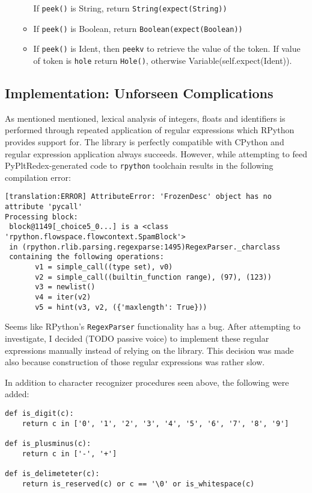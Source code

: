 \begin{itemize}
\begin{itemize}
		If \texttt{peek()} is String, return \texttt{String(expect(String))}
	\item
		If \texttt{peek()} is Boolean, return \texttt{Boolean(expect(Boolean))}
	\item

		If \texttt{peek()} is Ident, then \texttt{peekv} to retrieve the value of the token. If value of token is \texttt{hole} return \texttt{Hole()}, otherwise Variable(self.expect(Ident)).
	\end{itemize}
	

\end{itemize}

\subsection{Implementation: Unforseen Complications}
As mentioned mentioned, lexical analysis of integers, floats and identifiers is performed through repeated application of regular expressions which RPython provides support for. The library is perfectly compatible with CPython and regular expression application always succeeds. However, while attempting to feed PyPltRedex-generated code to \texttt{rpython} toolchain results in the following compilation error:

\begin{lstlisting}
[translation:ERROR] AttributeError: 'FrozenDesc' object has no attribute 'pycall'
Processing block:
 block@1149[_choice5_0...] is a <class 'rpython.flowspace.flowcontext.SpamBlock'> 
 in (rpython.rlib.parsing.regexparse:1495)RegexParser._charclass 
 containing the following operations: 
       v1 = simple_call((type set), v0) 
       v2 = simple_call((builtin_function range), (97), (123)) 
       v3 = newlist() 
       v4 = iter(v2) 
       v5 = hint(v3, v2, ({'maxlength': True})) 
\end{lstlisting}

Seems like RPython's \texttt{RegexParser} functionality has a bug. After attempting to investigate, I decided (TODO passive voice) to implement these regular expressions manually instead of relying on the library. This decision was made also because construction of those regular expressions was rather slow.

In addition to character recognizer procedures seen above, the following were added:

\begin{lstlisting}
def is_digit(c):
    return c in ['0', '1', '2', '3', '4', '5', '6', '7', '8', '9']

def is_plusminus(c):
    return c in ['-', '+']

def is_delimeteter(c):
    return is_reserved(c) or c == '\0' or is_whitespace(c)
\end{lstlisting}


